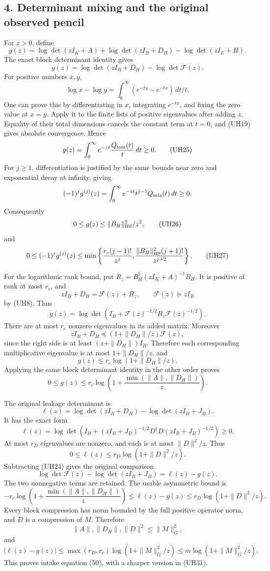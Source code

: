 \documentclass[11pt]{article}
\begin{document}
\subsection{4. Determinant mixing and the original observed pencil}\label{determinant-mixing-and-the-original-observed-pencil}

For \(z>0\), define \[
 g(z)=\log\det(zI_K+A)+\log\det(zI_B+D_H)
                    -\log\det(zI_E+H).
\] The exact block determinant identity gives \[
 g(z)=\log\det(zI_B+D_H)-\log\det\mathcal F(z).
 \tag{UH24}
\] For positive numbers \(x,y\), \[
 \log x-\log y=\int_0^\infty(e^{-ty}-e^{-tx})\,dt/t.
\] One can prove this by differentiating in \(x\), integrating \(e^{-tx}\), and fixing the zero value at \(x=y\). Apply it to the finite lists of positive eigenvalues after adding \(z\). Equality of their total dimensions cancels the constant term at \(t=0\), and (UH19) gives absolute convergence. Hence \[
 g(z)=\int_0^\infty e^{-zt}\frac{Q_{\rm mix}(t)}t\,dt\ge0.
 \tag{UH25}
\] For \(j\ge1\), differentiation is justified by the same bounds near zero and exponential decay at infinity, giving \[
 (-1)^jg^{(j)}(z)=
 \int_0^\infty e^{-zt}t^{j-1}Q_{\rm mix}(t)\,dt\ge0.
\] Consequently \[
 0\le g(z)\le\|B_H\|_{\rm HS}^2/z^2,
 \tag{UH26}
\] and \[
 0\le(-1)^jg^{(j)}(z)
 \le
 \min\left\{\frac{r_c(j-1)!}{z^j},
       \frac{\|B_H\|_{\rm HS}^2(j+1)!}{z^{j+2}}\right\}.
 \tag{UH27}
\]

For the logarithmic rank bound, put \(R_z=B_H^\dagger(zI_K+A)^{-1}B_H\). It is positive of rank at most \(r_c\), and \[
 zI_B+D_H=\mathcal F(z)+R_z,\qquad \mathcal F(z)\succeq zI_B
\] by (UH8). Thus \[
 g(z)=\log\det(I_B+\mathcal F(z)^{-1/2}R_z\mathcal F(z)^{-1/2}).
\] There are at most \(r_c\) nonzero eigenvalues in its added matrix. Moreover \[
 zI_B+D_H
 \preceq (1+\|D_H\|/z)\mathcal F(z),
\] since the right side is at least \((z+\|D_H\|)I_B\). Therefore each corresponding multiplicative eigenvalue is at most \(1+\|D_H\|/z\), and \[
 g(z)\le r_c\log(1+\|D_H\|/z).
\] Applying the same block determinant identity in the other order proves \[
 0\le g(z)\le r_c\log\left(1+\frac{\min(\|A\|,\|D_H\|)}z\right).
 \tag{UH28}
\]

The original leakage determinant is \[
 \ell(z)=\log\det(zI_B+D_H)-\log\det(zI_B+J_B).
\] It has the exact form \[
 \ell(z)=\log\det\left(I_B+
 (zI_B+J_B)^{-1/2}D^\dagger D(zI_B+J_B)^{-1/2}\right)\ge0.
\] At most \(r_D\) eigenvalues are nonzero, and each is at most \(\|D\|^2/z\). Thus \[
 0\le\ell(z)\le r_D\log(1+\|D\|^2/z).
 \tag{UH29}
\] Subtracting (UH24) gives the original comparison \[
 \log\det\mathcal F(z)-\log\det(zI_B+J_B)=\ell(z)-g(z).
 \tag{UH30}
\] The two nonnegative terms are retained. The usable asymmetric bound is \[
\boxed{
 -r_c\log\left(1+\frac{\min(\|A\|,\|D_H\|)}z\right)
 \le\ell(z)-g(z)
 \le r_D\log(1+\|D\|^2/z).}
 \tag{UH31}
\] Every block compression has norm bounded by the full positive operator norm, and \(D\) is a compression of \(M\). Therefore \[
 \|A\|,\|D_H\|,\|D\|^2\le\|M\|_G^2,
\] and \[
 |\ell(z)-g(z)|
 \le\max(r_D,r_c)\log(1+\|M\|_G^2/z)
 \le m\log(1+\|M\|_G^2/z).
 \tag{UH32}
\] This proves intake equation (50), with a sharper version in (UH31).
\end{document}
